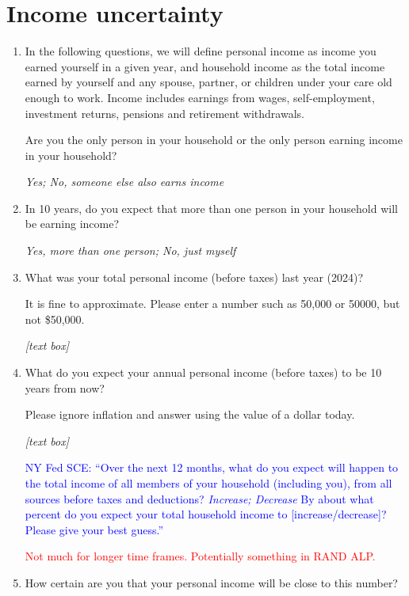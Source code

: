 \documentclass[11pt, headsepline]{article}
\newcommand{\blue}[1]{\textcolor{blue}{#1}}
\newcommand{\red}[1]{\textcolor{red}{#1}}
\begin{document}
\section*{Income uncertainty}

\begin{enumerate}[resume]

    \item In the following questions, we will define personal income as income you earned yourself in a given year, and household income as the total income earned by yourself and any spouse, partner, or children under your care old enough to work. Income includes earnings from wages, self-employment, investment returns, pensions and retirement withdrawals.
    
    Are you the only person in your household or the only person earning income in your household?

    \textit{Yes; No, someone else also earns income}

    \item In 10 years, do you expect that more than one person in your household will be earning income? 

    \textit{Yes, more than one person; No, just myself}

    \item What was your total personal income (before taxes) last year (2024)?

    It is fine to approximate. Please enter a number such as 50,000 or 50000, but not \$50,000.

    \textit{[text box]}

    \item What do you expect your annual personal income (before taxes) to be 10 years from now?

    Please ignore inflation and answer using the value of a dollar today.

    \textit{[text box]}

    \blue{NY Fed SCE: ``Over the next 12 months, what do you expect will happen to the total income of all members of your household (including you), from all sources before taxes and deductions? \textit{Increase; Decrease} By about what percent do you expect your total household income to [increase/decrease]? Please give your best guess.''}

    \red{Not much for longer time frames. Potentially something in RAND ALP.}

    \item How certain are you that your personal income will be close to this number?


\end{enumerate}
\end{document}
